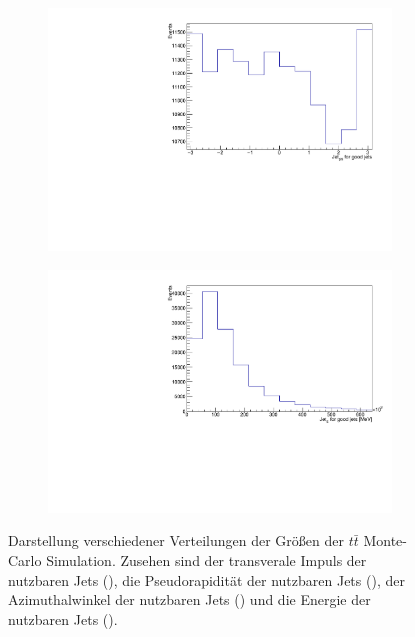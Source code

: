 \begin{figure}[H]
\begin{subfigure}{0.5\textwidth}
    \includegraphics[width=\linewidth]{plots_and_txt/ttbar.mu_selected_/ttbar.mu_selected_jet_phi_good.pdf}
    \caption{}
    \label{fig:jet_pt_good3}
  \end{subfigure}%
  \begin{subfigure}{0.5\textwidth}
    \centering
    \includegraphics[width=\linewidth]{plots_and_txt/ttbar.mu_selected_/ttbar.mu_selected_jet_E_good.pdf}
    \caption{}
    \label{fig:met_et3}
  \end{subfigure}%
  \caption{Darstellung verschiedener Verteilungen der Größen der $t\bar{t}$ Monte-Carlo Simulation.
  Zusehen sind der transverale Impuls der nutzbaren Jets (), die Pseudorapidität der nutzbaren Jets (), der Azimuthalwinkel der nutzbaren Jets () und die Energie der nutzbaren Jets ().
  }
  \label{fig:Distributions3}
\end{figure}

